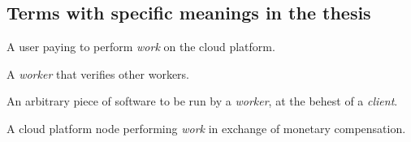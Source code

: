 \subsection*{Terms with specific meanings in the thesis}
\begin{description}[style=nextline]
  \item[Client] A user paying to perform \textit{work} on the cloud platform.
  \item[Verifier] A \textit{worker} that verifies other workers.
  \item[Work] An arbitrary piece of software to be run by a \textit{worker}, at the behest of a \textit{client}.
  \item[Worker] A cloud platform node performing \textit{work} in exchange of monetary compensation.
\end{description}

